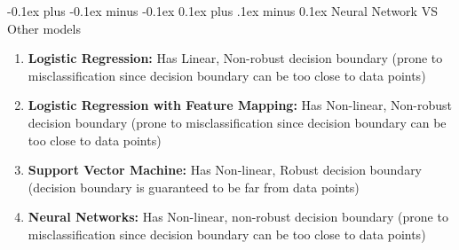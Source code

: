 \documentclass[landscape]{article}
\makeatletter
\renewcommand{\subsection}{\@startsection{subsection}{2}{0mm}%
  {-0.1ex plus -0.1ex minus -0.1ex}%
  {0.1ex plus .1ex minus 0.1ex}%
{\normalfont\scriptsize\bfseries}}
\makeatother
\begin{document}
\begin{multicols*}{5}
        \subsection{Neural Network VS Other models}
        \begin{enumerate}
          \item \textbf{Logistic Regression:} Has Linear, Non-robust decision boundary (prone to misclassification since decision boundary can be too close to data points)
          \item \textbf{Logistic Regression with Feature Mapping:} Has Non-linear, Non-robust decision boundary (prone to misclassification since decision boundary can be too close to data points)
          \item \textbf{Support Vector Machine:} Has Non-linear, Robust decision boundary (decision boundary is guaranteed to be far from data points)
          \item \textbf{Neural Networks:} Has Non-linear, non-robust decision boundary (prone to misclassification since decision boundary can be too close to data points)
        \end{enumerate}


\end{multicols*}
\end{document}
